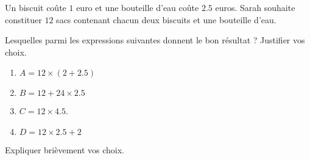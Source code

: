 
\begin{exercice}\label{exosmath-0885}

    Un biscuit coûte \( 1\) euro et une bouteille d'eau coûte \( 2.5\) euros. Sarah souhaite constituer \( 12\) sacs contenant chacun deux biscuits et une bouteille d'eau. 

            Lesquelles parmi les expressions suivantes donnent le bon résultat ? Justifier vos choix.
            \begin{enumerate}
                \item
                    \( A=12\times (   2+2.5 )\)
                \item
                    \( B=12+24\times 2.5\)
                \item
                    \( C=12\times 4.5\).
                \item
                    \( D=12\times 2.5+2\)
            \end{enumerate}
    Expliquer brièvement vos choix.

\end{exercice}
